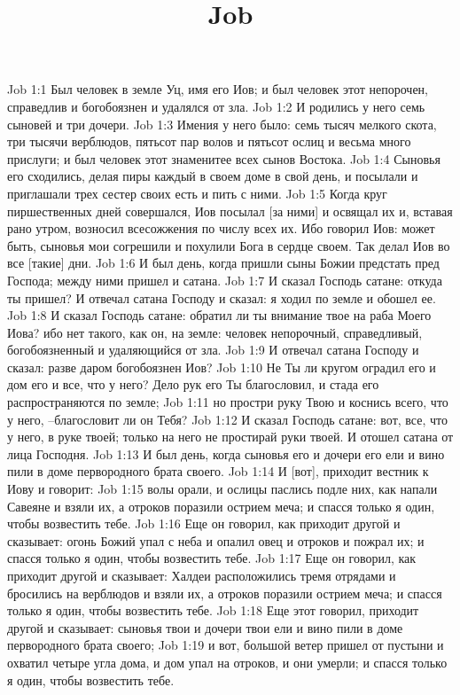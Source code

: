 

\title{Job}

Job 1:1  Был человек в земле Уц, имя его Иов; и был человек этот непорочен, справедлив и богобоязнен и удалялся от зла.
Job 1:2  И родились у него семь сыновей и три дочери.
Job 1:3  Имения у него было: семь тысяч мелкого скота, три тысячи верблюдов, пятьсот пар волов и пятьсот ослиц и весьма много прислуги; и был человек этот знаменитее всех сынов Востока.
Job 1:4  Сыновья его сходились, делая пиры каждый в своем доме в свой день, и посылали и приглашали трех сестер своих есть и пить с ними.
Job 1:5  Когда круг пиршественных дней совершался, Иов посылал [за ними] и освящал их и, вставая рано утром, возносил всесожжения по числу всех их. Ибо говорил Иов: может быть, сыновья мои согрешили и похулили Бога в сердце своем. Так делал Иов во все [такие] дни.
Job 1:6  И был день, когда пришли сыны Божии предстать пред Господа; между ними пришел и сатана.
Job 1:7  И сказал Господь сатане: откуда ты пришел? И отвечал сатана Господу и сказал: я ходил по земле и обошел ее.
Job 1:8  И сказал Господь сатане: обратил ли ты внимание твое на раба Моего Иова? ибо нет такого, как он, на земле: человек непорочный, справедливый, богобоязненный и удаляющийся от зла.
Job 1:9  И отвечал сатана Господу и сказал: разве даром богобоязнен Иов?
Job 1:10  Не Ты ли кругом оградил его и дом его и все, что у него? Дело рук его Ты благословил, и стада его распространяются по земле;
Job 1:11  но простри руку Твою и коснись всего, что у него, --благословит ли он Тебя?
Job 1:12  И сказал Господь сатане: вот, все, что у него, в руке твоей; только на него не простирай руки твоей. И отошел сатана от лица Господня.
Job 1:13  И был день, когда сыновья его и дочери его ели и вино пили в доме первородного брата своего.
Job 1:14  И [вот], приходит вестник к Иову и говорит:
Job 1:15  волы орали, и ослицы паслись подле них, как напали Савеяне и взяли их, а отроков поразили острием меча; и спасся только я один, чтобы возвестить тебе.
Job 1:16  Еще он говорил, как приходит другой и сказывает: огонь Божий упал с неба и опалил овец и отроков и пожрал их; и спасся только я один, чтобы возвестить тебе.
Job 1:17  Еще он говорил, как приходит другой и сказывает: Халдеи расположились тремя отрядами и бросились на верблюдов и взяли их, а отроков поразили острием меча; и спасся только я один, чтобы возвестить тебе.
Job 1:18  Еще этот говорил, приходит другой и сказывает: сыновья твои и дочери твои ели и вино пили в доме первородного брата своего;
Job 1:19  и вот, большой ветер пришел от пустыни и охватил четыре угла дома, и дом упал на отроков, и они умерли; и спасся только я один, чтобы возвестить тебе.
